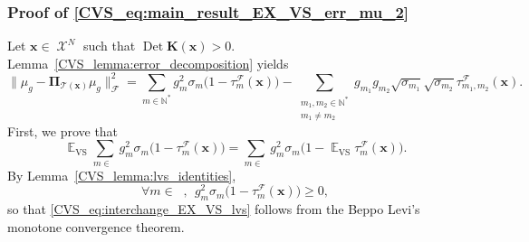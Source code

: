 \documentclass[twoside,11pt]{book}
\numberwithin{theorem}{chapter}
\numberwithin{definition}{chapter}
\numberwithin{proposition}{chapter}
\numberwithin{corollary}{chapter}
\numberwithin{example}{chapter}
\numberwithin{lemma}{chapter}
\numberwithin{assumption}{chapter}
\numberwithin{equation}{chapter}
\numberwithin{figure}{chapter}
\DeclareMathOperator{\Det}{Det}
\DeclareMathOperator{\VS}{\mathrm{VS}}
\DeclareMathOperator{\EX}{\mathbb{E}}
\DeclareMathOperator{\F}{\mathcal{F}}
\DeclareMathOperator{\X}{\mathcal{X}}
\DeclareMathOperator{\Ns}{\mathbb{N}^{*}}
\newcommand{\rb}[1]{\textcolor{magenta}{#1}}
\begin{document}
\subsubsection{Proof of \eqref{CVS_eq:main_result_EX_VS_err_mu_2}}
Let $\bm{x} \in \X^{N}$ such that $\Det \bm{K}(\bm{x}) >0 $. Lemma~\ref{CVS_lemma:error_decomposition} yields
\begin{equation}
\|\mu_{g} - \bm{\Pi}_{\mathcal{T}(\bm{x})} \mu_{g}\|_{\F}^{2}  = \sum\limits_{m \in \mathbb{N}^{*}} g_{m}^{2} \sigma_{m}\bigg(1- \tau_{m}^{\F}(\bm{x})\bigg) - \sum\limits_{\substack{m_{1},m_{2} \in \mathbb{N}^{*} \\ m_{1} \neq m_{2}}}  g_{m_{1}}g_{m_{2}} \sqrt{\sigma_{m_{1}}} \sqrt{\sigma_{m_{2}}} \tau_{m_{1},m_{2}}^{\F}(\bm{x}).
\end{equation}
First, we prove that
\begin{equation}\label{CVS_eq:interchange_EX_VS_lvs}
\EX_{\VS} \sum\limits_{m \in \Ns} g_{m}^{2} \sigma_{m}\bigg(1- \tau_{m}^{\F}(\bm{x})\bigg) = \sum\limits_{m \in \Ns} g_{m}^{2} \sigma_{m}\bigg(1- \EX_{\VS}\tau_{m}^{\F}(\bm{x})\bigg).
\end{equation}
By Lemma~\ref{CVS_lemma:lvs_identities},
\begin{equation}
\forall m \in \Ns, \:\: g_{m}^{2} \sigma_{m}\bigg(1- \tau_{m}^{\F}(\bm{x})\bigg)\geq 0, \label{CVS_e:summable_term}
\end{equation}
so that \eqref{CVS_eq:interchange_EX_VS_lvs} follows from the Beppo Levi's monotone convergence theorem.
\end{document}
